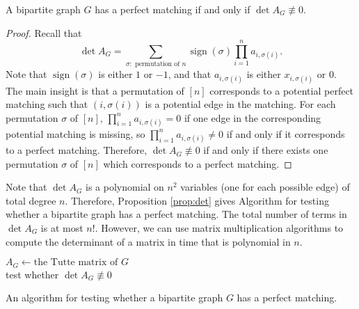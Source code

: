 \documentclass[letterpaper, reqno,11pt]{article}
\DeclareMathOperator{\sign}{sign}
\begin{document}
\begin{proposition} \label{prop:det}
  A bipartite graph $G$ has a perfect matching if and only if $\det A_G \not \equiv 0$.
\end{proposition}

\begin{proof}
  Recall that
  $$ \det A_G = \sum_{\sigma: \text{ permutation of $n$}} \sign(\sigma) \prod_{i = 1}^n a_{i, \sigma(i)}. $$
  Note that $\sign(\sigma)$ is either $1$ or $-1$, and that $a_{i, \sigma(i)}$ is either $x_{i, \sigma(i)}$ or $0$. The main insight is that a permutation of $[n]$ corresponds to a potential perfect matching such that $(i, \sigma(i))$ is a potential edge in the matching. For each permutation $\sigma$ of $[n]$, $\prod_{i = 1}^n a_{i, \sigma(i)} = 0$ if one edge in the corresponding potential matching is missing, so $\prod_{i = 1}^n a_{i, \sigma(i)} \neq 0$ if and only if it corresponds to a perfect matching. Therefore, $\det A_G \not \equiv 0$ if and only if there exists one permutation $\sigma$ of $[n]$ which corresponds to a perfect matching.
\end{proof}

Note that $\det A_G$ is a polynomial on $n^2$ variables (one for each possible edge) of total degree $n$. Therefore, Proposition \ref{prop:det} gives Algorithm for testing whether a bipartite graph has a perfect matching. The total number of terms in $\det A_G$ is at most $n!$. However, we can use matrix multiplication algorithms to compute the determinant of a matrix in time that is polynomial in $n$.

\begin{algorithm}
  $A_G \leftarrow \text{the Tutte matrix of $G$}$ \\
  test whether $\det A_G \not\equiv 0$ \\
  \caption{An algorithm for testing whether a bipartite graph $G$ has a perfect matching.}
\end{algorithm}
\end{document}
